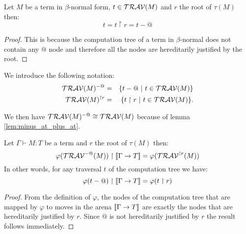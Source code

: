 \begin{lem}
Let $M$ be a term in $\beta$-normal form, $t \in
\mathcal{TRAV}(M)$ and $r$ the root of $\tau(M)$ then:
$$t = t \upharpoonright r = t - @$$
\end{lem}
\begin{proof}
This is because the computation tree of a term in $\beta$-normal
does not contain any $@$ node and therefore all the nodes are
hereditarily justified by the root.
\end{proof}

We introduce the following notation:
\begin{eqnarray*}
\mathcal{TRAV}(M)^{-@} &=& \{ t - @ \ | \  t \in \mathcal{TRAV}(M) \} \\
\mathcal{TRAV}(M)^{\upharpoonright r} &=& \{ t  \upharpoonright r \ | \  t  \in \mathcal{TRAV}(M) \} .
\end{eqnarray*}

We then have $\mathcal{TRAV}(M)^{-@} \cong \mathcal{TRAV}(M)$ because of lemma \ref{lem:minus_at_plus_at}.

\begin{lem} Let $\Gamma \vdash M :T$ be a term and $r$ the root of $\tau(M)$ then:
\label{lem:varphi_filter}
$$ \varphi(\mathcal{TRAV}^{-@}(M)) \upharpoonright {[\![\Gamma \rightarrow T ]\!]} = \varphi(\mathcal{TRAV}^{\upharpoonright r}(M)) $$
In other words, for any traversal $t$ of the computation tree we have:
$$\varphi(t-@) \upharpoonright {[\![\Gamma \rightarrow T ]\!]} = \varphi(t\upharpoonright r)$$
\end{lem}
\begin{proof}
    From the definition of $\varphi$, the nodes of the computation tree that are mapped by $\varphi$
    to moves in the arena ${[\![ \Gamma \rightarrow T ]\!]}$ are exactly the nodes that are hereditarily justified by $r$.
    Since $@$ is not hereditarily justified by $r$ the result follows immediately.
\end{proof}

